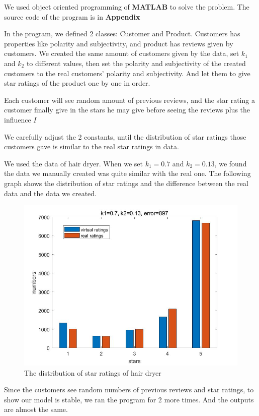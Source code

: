 \documentclass[12pt]{article}  %
\begin{document}
We used object oriented programming of \textbf{MATLAB} to solve the problem. The source code of the program is in \textbf{Appendix}

In the program, we defined 2 classes: Customer and Product. Customers has properties like polarity and subjectivity, and product has reviews given by customers. We created the same amount of customers given by the data, set $k_1$ and $k_2$ to different values, then set the polarity and subjectivity of the created customers to the real customers' polarity and subjectivity. And let them to give star ratings of the product one by one in order.

Each customer will see random amount of previous reviews, and the star rating a customer finally give in the stars he may give before seeing the reviews plus the influence $I$

We carefully adjust the 2 constants, until the distribution of star ratings those customers gave is similar to the real star ratings in data.

We used the data of hair dryer. When we set $k_1=0.7$ and $k_2=0.13$, we found the data we manually created was quite similar with the real one. The following graph shows the distribution of star ratings and the difference between the real data and the data we created.

\begin{figure}[H]
  \centering
  \includegraphics[width=0.7\linewidth]{Q4picture/0.jpg}
  \caption{The distribution of star ratings of hair dryer}
  \label{fig:}
\end{figure}

Since the customers see random numbers of previous reviews and star ratings, to show our model is stable, we ran the program for 2 more times. And the outputs are almost the same.
\end{document}
